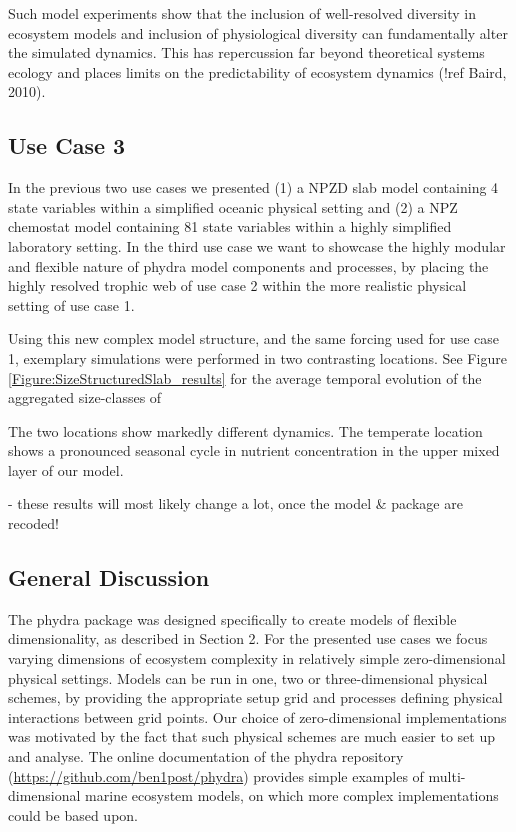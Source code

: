 \documentclass[journal abbreviations, manuscript]{copernicus}
\begin{document}
Such model experiments show that the inclusion of well-resolved diversity in ecosystem models and inclusion of physiological diversity can fundamentally alter the simulated dynamics. This has repercussion far beyond theoretical systems ecology and places limits on the predictability of ecosystem dynamics (!ref Baird, 2010).


\subsection{Use Case 3}
In the previous two use cases we presented (1) a NPZD slab model containing 4 state variables within a simplified oceanic physical setting and (2) a NPZ chemostat model containing 81 state variables within a highly simplified laboratory setting. 
In the third use case we want to showcase the highly modular and flexible nature of phydra model components and processes, by placing the highly resolved trophic web of use case 2 within the more realistic physical setting of use case 1.

Using this new complex model structure, and the same forcing used for use case 1, exemplary simulations were performed in two contrasting locations. 
See Figure \ref{Figure:SizeStructuredSlab_results} for the average temporal evolution of the aggregated size-classes of 

The two locations show markedly different dynamics. The temperate location shows a pronounced seasonal cycle in nutrient concentration in the upper mixed layer of our model. 

- these results will most likely change a lot, once the model \& package are recoded!


\subsection{General Discussion}

The phydra package was designed specifically to create models of flexible dimensionality, as described in Section 2. For the presented use cases we focus varying dimensions of ecosystem complexity in relatively simple zero-dimensional physical settings. Models can be run in one, two or three-dimensional physical schemes, by providing the appropriate setup grid and processes defining physical interactions between grid points. Our choice of zero-dimensional implementations was motivated by the fact that such physical schemes are much easier to set up and analyse. The online documentation of the phydra repository (\url{https://github.com/ben1post/phydra}) provides simple examples of multi-dimensional marine ecosystem models, on which more complex implementations could be based upon.
\end{document}
